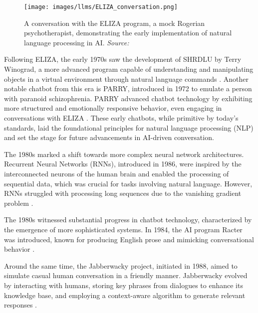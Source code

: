 \begin{figure}[h!]
    \centering
    \texttt{[image: images/llms/ELIZA\_conversation.png]}
    \caption{A conversation with the ELIZA program, a mock Rogerian psychotherapist, demonstrating the early implementation of natural language processing in AI. \textit{Source:} \cite{eliza_wikipedia}}
    \label{fig:eliza_conversation}
\end{figure}

Following ELIZA, the early 1970s saw the development of SHRDLU by Terry Winograd, a more advanced program capable of understanding and manipulating objects in a virtual environment through natural language commands \cite{winograd1972understanding}. Another notable chatbot from this era is PARRY, introduced in 1972 to emulate a person with paranoid schizophrenia. PARRY advanced chatbot technology by exhibiting more structured and emotionally responsive behavior, even engaging in conversations with ELIZA \cite{colby1971artificial}. These early chatbots, while primitive by today’s standards, laid the foundational principles for natural language processing (NLP) and set the stage for future advancements in AI-driven conversation.

The 1980s marked a shift towards more complex neural network architectures. Recurrent Neural Networks (RNNs), introduced in 1986, were inspired by the interconnected neurons of the human brain and enabled the processing of sequential data, which was crucial for tasks involving natural language. However, RNNs struggled with processing long sequences due to the vanishing gradient problem \cite{elman1990finding}.

The 1980s witnessed substantial progress in chatbot technology, characterized by the emergence of more sophisticated systems. In 1984, the AI program Racter was introduced, known for producing English prose and mimicking conversational behavior \cite{wikipedia2023racter}. 

Around the same time, the Jabberwacky project, initiated in 1988, aimed to simulate casual human conversation in a friendly manner. Jabberwacky evolved by interacting with humans, storing key phrases from dialogues to enhance its knowledge base, and employing a context-aware algorithm to generate relevant responses \cite{shawar2007fostering}.

